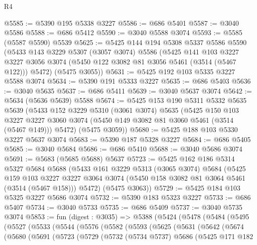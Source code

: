 \begin{lexlean}{R4}
\begin{coremodule}
@5585 := @5390 @195 @5338 @3227
@5586 := @686 @5401
@5587 := @3040 @5586
@5588 := @686 @5412
@5590 := @3040 @5588 @3074
@5593 := @5585 (@5587 @5590) @5539
@5625 := @5425
    @144
    @194
    @5308
    @5337
    @5586
    @5590
    (@5433
      @143
      @3229
      @5307
      (@3057 @3074)
      @5586
      (@5425
        @141
        @103
        @3227
        @3227
        @3056
        @3074
        (@5450 @122 @3082 @81 @3056 @5461 (@3514 (@5467 @122)))
        @5472)
      (@5475 @3055))
@5631 := @5425 @192 @103 @5335 @3227 @5588 @3074
@5634 := @5390 @191 @5333 @3227
@5635 := @686 @5403
@5636 := @3040 @5635
@5637 := @686 @5411
@5639 := @3040 @5637 @3074
@5642 := @5634 (@5636 @5639) @5588
@5674 := @5425
    @153
    @190
    @5311
    @5332
    @5635
    @5639
    (@5433
      @152
      @3229
      @5310
      (@3061 @3074)
      @5635
      (@5425
        @150
        @103
        @3227
        @3227
        @3060
        @3074
        (@5450 @149 @3082 @81 @3060 @5461 (@3514 (@5467 @149)))
        @5472)
      (@5475 @3059))
@5680 := @5425 @188 @103 @5330 @3227 @5637 @3074
@5683 := @5390 @187 @5328 @3227
@5684 := @686 @5405
@5685 := @3040 @5684
@5686 := @686 @5410
@5688 := @3040 @5686 @3074
@5691 := @5683 (@5685 @5688) @5637
@5723 := @5425
    @162
    @186
    @5314
    @5327
    @5684
    @5688
    (@5433
      @161
      @3229
      @5313
      (@3065 @3074)
      @5684
      (@5425
        @159
        @103
        @3227
        @3227
        @3064
        @3074
        (@5450 @158 @3082 @81 @3064 @5461 (@3514 (@5467 @158)))
        @5472)
      (@5475 @3063))
@5729 := @5425 @184 @103 @5325 @3227 @5686 @3074
@5732 := @5390 @183 @5323 @3227
@5733 := @686 @5407
@5734 := @3040 @5733
@5735 := @686 @5409
@5737 := @3040 @5735 @3074
@5853 := fun (digest : @3035) =>
  @5388
    (@5424
      (@5478
        (@5484
          (@5495
            (@5527
              (@5533
                (@5544
                  (@5576
                    (@5582
                      (@5593
                        (@5625
                          (@5631
                            (@5642
                              (@5674
                                (@5680
                                  (@5691
                                    (@5723
                                      (@5729
                                        (@5732
                                          (@5734 @5737)
                                          @5686
                                          (@5425
                                            @171
                                            @182

\end{coremodule}
\end{lexlean}
